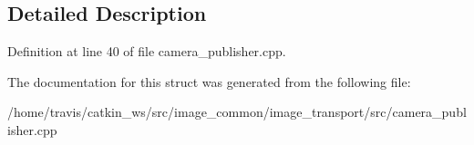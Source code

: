 \subsection{Detailed Description}


Definition at line 40 of file camera\-\_\-publisher.\-cpp.



The documentation for this struct was generated from the following file\-:\begin{DoxyCompactItemize}
\item 
/home/travis/catkin\-\_\-ws/src/image\-\_\-common/image\-\_\-transport/src/camera\-\_\-publisher.\-cpp\end{DoxyCompactItemize}
